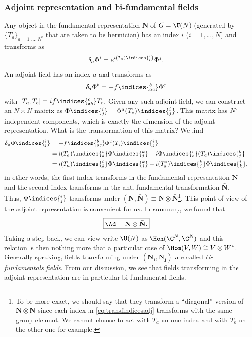\documentclass{worksheetclass}
\begin{document}
        \subsubsection{Adjoint representation and bi-fundamental fields}

            Any object in the fundamental representation $\textbf{N}$ of $G=\U(N)$ (generated by $\{T_a\}_{a=1,\dots,N^2}$ that are taken to be hermician) has an index $i$ ($i=1,\dots,N$) and transforms as
            \begin{equation}
                \delta_a\Phi^i= e^{i(T_a)\indices{^i_j}}\Phi^j.
            \end{equation}
            An adjoint field has an index $a$ and transforms as
            \begin{equation}
                \delta_a\Phi^b = -f\indices{_{ac}^b}\Phi^c
            \end{equation}
            with $[T_a,T_b]=if\indices{_{ab}^c}T_c$. Given any such adjoint field, we can construct an $N\times N$ matrix as $\Phi\indices{^i_j}=\Phi^a (T_a)\indices{^i_j}$. This matrix has $N^2$ independent components, which is exactly the dimension of the adjoint representation. What is the transformation of this matrix? We find
            \begin{align}
                \delta_a\Phi\indices{^i_j}&=-f\indices{_{ac}^b}\Phi^c (T_b)\indices{^i_j}\\
                &= i(T_a)\indices{^i_k}\Phi\indices{^k_j}-i\Phi\indices{^i_k}(T_a)\indices{^k_j}\\
                &= i(T_a)\indices{^i_k}\Phi\indices{^k_j}-i(T^*_a)\indices{_j^k}\Phi\indices{^i_k},\label{eq:transfindicesadj}
            \end{align}
            in other words, the first index transforms in the fundamental representation $\textbf{N}$ and the second index transforms in the anti-fundamental transformation $\bar{\textbf{N}}$. Thus, $\Phi\indices{^i_j}$ transforms under $(\textbf{N},\bar{\textbf{N}})\equiv\textbf{N}\otimes\bar{\textbf{N}}$\footnote{To be more exact, we should say that they transform a ``diagonal'' version of $\textbf{N}\otimes\bar{\textbf{N}}$ since each index in \eqref{eq:transfindicesadj} transforms with the same group element. We cannot choose to act with $T_a$ on one index and with $T_b$ on the other one for example.}. This point of view of the adjoint representation is convenient for us. In summary, we found that
            \begin{equation}
                \boxed{\Ad = \textbf{N}\otimes\bar{\textbf{N}}.}\label{eq:bufundadjoint}
            \end{equation}
            Taking a step back, we can view write $\U(N)$ as $\Hom(\C^N,\C^N)$ and this relation is then nothing more that a particular case of $\Hom(V,W)\cong V\otimes W^*$. Generally speaking, fields transforming under $(\boldsymbol{\textbf{N}_i},\bar{\boldsymbol{\textbf{N}_j}})$ are called \emph{bi-fundamentals fields}. From our discussion, we see that fields transforming in the adjoint representation are in particular bi-fundamental fields.
\end{document}
